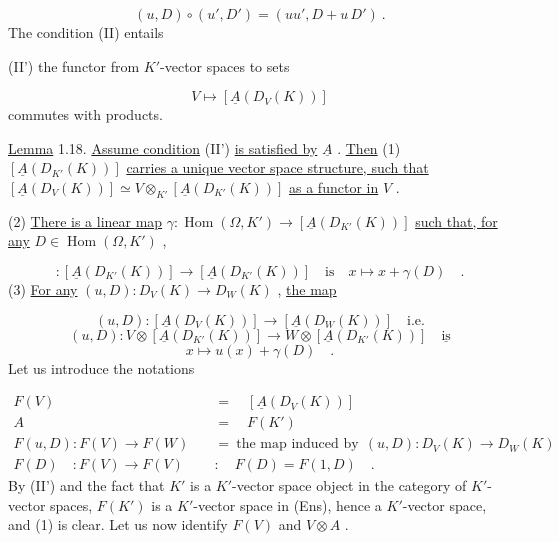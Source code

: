 \begin{equation*}
(u, D) \circ (u', D') = (uu', D + u\,D')\ .
\end{equation*}
The condition (II) entails

(II')  the functor from $K'$-vector spaces to sets

\begin{equation*}
V \longmapsto [\underline{A}(D_V(K))]
\end{equation*}
commutes with products.

\underline{Lemma} 1.18.  \underline{Assume condition} (II') \underline{is satisfied by} $\underline{A}$ . \underline{Then}
(1)  $[\underline{A}(D_{K'}(K))]$  \underline{carries a unique vector space structure, such that}  $[\underline{A}(D_{V}(K))] \simeq V \otimes_{K'} [\underline{A}(D_{K'}(K))]$  \underline{as a functor in}  $V$ .

(2)   \underline{There is a linear map}  $\gamma : \operatorname{Hom}(\Omega,K') \rightarrow [\underline{A}(D_{K'}(K))]$  \underline{such that, for any}  $D \in \operatorname{Hom}(\Omega, K')$  ,

\begin{equation*}
[\underline{A}((1, D))] : [\underline{A}(D_{K'}(K))] \rightarrow [\underline{A}(D_{K'}(K))] \quad \text{is} \quad x \longmapsto x + \gamma(D) \quad .
\end{equation*}
(3)   \underline{For any}  $(u, D) : D_{V}(K) \longrightarrow D_{W}(K)$  , \underline{the map}

\begin{equation*}
(u, D) : [\underline{A}(D_{V}(K))] \rightarrow [\underline{A}(D_{W}(K))] \quad \text{i.e.}
\end{equation*}
\begin{equation*}
(u, D) : V \otimes [\underline{A}(D_{K'}(K))] \rightarrow W \otimes [\underline{A}(D_{K'}(K))] \quad \underline{\text{is}}
\end{equation*}
\begin{equation*}
x \longmapsto u(x) + \gamma(D) \quad .
\end{equation*}
Let us introduce the notations

\begin{equation*}
\begin{aligned}
F(V) \quad &= \quad [\underline{A}(D_{V}(K))] \\
A \quad &= \quad F(K') \\
F(u,D) : F(V) \rightarrow F(W) \quad &= \ \text{the map induced by} \ \ (u,D) : D_{V}(K) \rightarrow D_{W}(K) \\
F(D) \quad : F(V) \rightarrow F(V) \quad &: \quad F(D) = F(1, D) \quad .
\end{aligned}
\end{equation*}
By (II') and the fact that  $K'$  is a  $K'$-vector space object in the category of $K'$-vector spaces,  $F(K')$  is a  $K'$-vector space in (Ens), hence a  $K'$-vector space, and (1) is clear. Let us now identify  $F(V)$  and  $V \otimes A$  .

